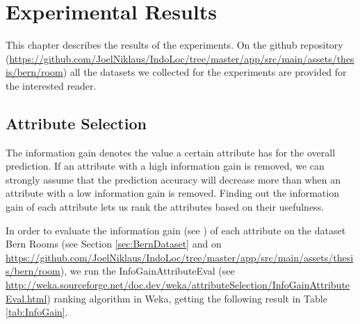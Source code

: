 
\chapter{Experimental Results} %
\label{Chapter4} %



This chapter describes the results of the experiments. 
On the github repository (\url{https://github.com/JoelNiklaus/IndoLoc/tree/master/app/src/main/assets/thesis/bern/room}) all the datasets  we collected for the experiments are provided for the interested reader.


\section{Attribute Selection}
\label{sec:AttributeSelection}

The information gain denotes the value a certain attribute has for the overall prediction. If an attribute with a high information gain is removed, we can strongly assume that the prediction accuracy will decrease more than when an attribute with a low information gain is removed. Finding out the information gain of each attribute lets us rank the attributes based on their usefulness.

In order to evaluate the information gain (see \cite{Frank2010}) of each attribute on the dataset Bern Rooms (see Section \ref{sec:BernDataset} and on \url{https://github.com/JoelNiklaus/IndoLoc/tree/master/app/src/main/assets/thesis/bern/room}), we run the  InfoGainAttributeEval (see  \url{http://weka.sourceforge.net/doc.dev/weka/attributeSelection/InfoGainAttributeEval.html}) ranking algorithm in Weka, getting the  following result in Table \ref{tab:InfoGain}.

